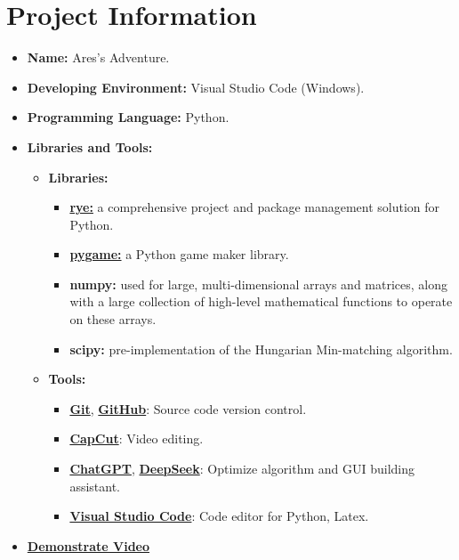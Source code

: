 \section{Project Information}
\begin{itemize}
  \item \textbf{Name:} Ares's Adventure.
  \item \textbf{Developing Environment:} Visual Studio Code (Windows).
  \item \textbf{Programming Language:} Python.
  \item \textbf{Libraries and Tools:}
        \begin{itemize}
          \item \textbf{Libraries:}
                \begin{itemize}
                  \item \href{https://rye.astral.sh/}{\textbf{rye:}} a comprehensive project and package management solution for Python.
                  \item \href{https://www.pygame.org/docs/}{\textbf{pygame:}} a Python game maker library.
                  \item \textbf{numpy:} used for large, multi-dimensional arrays and matrices, along with a large collection of high-level mathematical functions to operate on these arrays.
                  \item \textbf{scipy:} pre-implementation of the Hungarian Min-matching algorithm.
                \end{itemize}
          \item \textbf{Tools:}
                \begin{itemize}
                  \item \href{https://git-scm.com/}{\textbf{Git}}, \href{https://github.com/}{\textbf{GitHub}}: Source code version control.
                  \item \href{https://www.capcut.com/}{\textbf{CapCut}}: Video editing.
                  \item \href{https://chatgpt.com/}{\textbf{ChatGPT}}, \href{https://chat.deepseek.com/}{\textbf{DeepSeek}}: Optimize algorithm and GUI building assistant.
                  \item \href{https://code.visualstudio.com/}{\textbf{Visual Studio Code}}: Code editor for Python, Latex.
                \end{itemize}
        \end{itemize}
  \item \href{https://drive.google.com/file/d/12RS0jXp9hENSywhjM4eynz6p-od15LpT/view?usp=drive_link}{\textbf{Demonstrate Video}}
\end{itemize}
